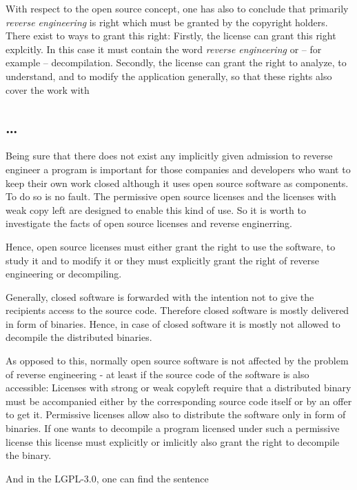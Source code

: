 With respect to the open source concept, one has also to conclude that primarily
\emph{reverse engineering} is right which must be granted by the copyright
holders. There exist to ways to grant this right: Firstly, the license can grant
this right explcitly. In this case it must contain the word \emph{reverse
engineering} or -- for example -- decompilation. Secondly, the license can grant
the right to analyze, to understand, and to modify the application generally, so
that these rights also cover the work with

\subsection{\ldots}

Being sure that there does not exist any implicitly given admission to reverse 
engineer a program is important for those companies and developers who want to
keep their own work closed although it uses open source software as components.
To do so is no fault. The permissive open source licenses and the licenses with
weak copy left are designed to enable this kind of use. So it is worth to
investigate the facts of open source licenses and reverse enginerring.



Hence, open source licenses must either grant the right to use the software, to
study it and to modify it or they must explicitly grant the right of reverse
engineering or decompiling.

Generally, closed software is forwarded with the intention not to give the
recipients access to the source code. Therefore closed software is mostly
delivered in form of binaries. Hence, in case of closed software it is mostly
not allowed to decompile the distributed binaries.

As opposed to this, normally open source software is not affected by the problem
of reverse engineering - at least if the source code of the software is also
accessible: Licenses with strong or weak copyleft require that a distributed
binary must be accompanied either by the corresponding source code itself or by
an offer to get it. Permissive licenses allow also to distribute the software
only in form of binaries. If one wants to decompile a program licensed under
such a permissive license this license must explicitly or imlicitly also grant
the right to decompile the binary.




And in the LGPL-3.0, one can find the sentence


